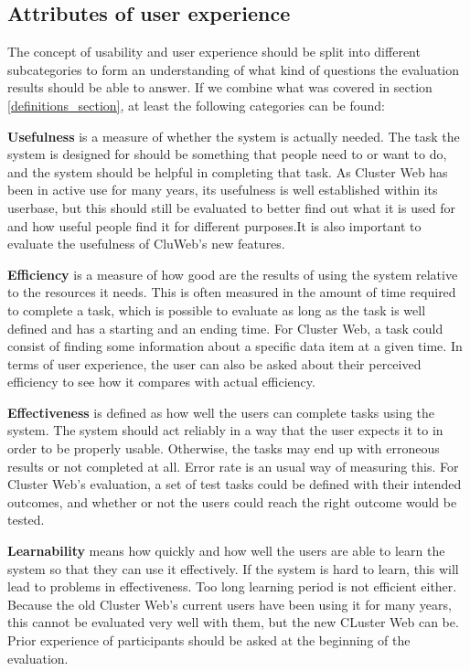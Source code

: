 \subsection{Attributes of user experience}\label{usability_attributes}
The concept of usability and user experience should be split into different subcategories to form an understanding of what kind of questions the evaluation results should be able to answer. If we combine what was covered in section \ref{definitions_section}, at least the following categories can be found:

\textbf{Usefulness} is a measure of whether the system is actually needed. The task the system is designed for should be something that people need to or want to do, and the system should be helpful in completing that task. As Cluster Web has been in active use for many years, its usefulness is well established within its userbase, but this should still be evaluated to better find out what it is used for and how useful people find it for different purposes.It is also important to evaluate the usefulness of CluWeb's new features.

\textbf{Efficiency} is a measure of how good are the results of using the system relative to the resources it needs. This is often measured in the amount of time required to complete a task, which is possible to evaluate as long as the task is well defined and has a starting and an ending time. For Cluster Web, a task could  consist of finding some information about a specific data item at a given time. In terms of user experience, the user can also be asked about their perceived efficiency to see how it compares with actual efficiency.

\textbf{Effectiveness} is defined as how well the users can complete tasks using the system. The system should act reliably in a way that the user expects it to in order to be properly usable. Otherwise, the tasks may end up with erroneous results or not completed at all. Error rate is an usual way of measuring this. For Cluster Web's evaluation, a set of test tasks could be defined with their intended outcomes, and whether or not the users could reach the right outcome would be tested.

\textbf{Learnability} means how quickly and how well the users are able to learn the system so that they can use it effectively. If the system is hard to learn, this will lead to problems in effectiveness. Too long learning period is not efficient either. Because the old Cluster Web's current users have been using it for many years, this cannot be evaluated very well with them, but the new CLuster Web can be. Prior experience of participants should be asked at the beginning of the evaluation.

